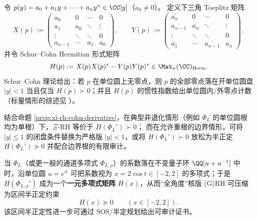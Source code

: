 \begin{remark}\label{rem:xi-schur-cohn-sdp-interface}
令 \(p(y)=a_0+a_1y+\cdots+a_n y^n\in\CC[y]\)（\(a_0\neq 0\)）。
定义下三角 Toeplitz 矩阵
\[
X(p):=\begin{pmatrix}
a_0 & 0 & \cdots & 0\\
a_1 & a_0 & \ddots & \vdots\\
\vdots & \ddots & \ddots & 0\\
a_{n-1} & \cdots & a_1 & a_0
\end{pmatrix},
\qquad
Y(p):=\begin{pmatrix}
\overline{a_n} & 0 & \cdots & 0\\
\overline{a_{n-1}} & \overline{a_n} & \ddots & \vdots\\
\vdots & \ddots & \ddots & 0\\
\overline{a_1} & \cdots & \overline{a_{n-1}} & \overline{a_n}
\end{pmatrix},
\]
并令 Schur--Cohn Hermitian 形式矩阵
\[
H(p):=X(p)X(p)^\ast-Y(p)Y(p)^\ast\in\Mat_n(\CC)_{\mathrm{Herm}}.
\]
Schur--Cohn 理论给出：若 \(p\) 在单位圆上无零点，则 \(p\) 的全部零点落在开单位圆盘 \(|y|<1\) 当且仅当 \(H(p)\succ 0\)；并且 \(H(p)\) 的惯性指数给出单位圆内/外零点计数（标量情形的综述见 \cite{DymYoung1990SchurCohnMatrixPolynomials}）。
\par
结合命题 \ref{prop:xi-rh-cohn-derivative}，在典型非退化情形（例如 \(\Phi_L\) 的单位圆根均为单根）下，\(\Xi\)-RH 等价于 \(H(\Phi_L')\succ 0\)；
而在允许重根的边界情形，可将 \(|y|\le 1\) 的闭盘条件替换为严格版 \(|y|<1\)，或将 \(H(\Phi_L')\succ 0\) 放松为半正定 \(H(\Phi_L')\succeq 0\) 并配合边界根的有限审计。
\par
当 \(\Phi_L\)（或更一般的通道多项式 \(\Phi_{L,\rho}\)）的系数落在不变量子环 \(\QQ[u+u^{-1}]\) 中时，沿单位圆 \(u=e^{it}\) 可把系数视为 \(x=2\cos t\in[-2,2]\) 的多项式；于是 \(H(\Phi_{L,\rho}')\) 成为一个\textbf{一元多项式矩阵} \(H(x)\)，从而“全角度”核版 (G)RH 可压缩为区间半正定约束
\[
H(x)\succeq 0\qquad(x\in[-2,2]).
\]
该区间半正定性进一步可通过 SOS/半定规划给出可审计证书。
\end{remark}

